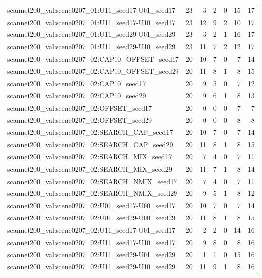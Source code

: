 \begin{table}[t]
\begin{tabular}{lrrrrrr}
scannet200\_val:scene0207\_01:U11\_seed17-U01\_seed17 & 23 & 3 & 2 & 0 & 15 & 17 \\
scannet200\_val:scene0207\_01:U11\_seed17-U10\_seed17 & 23 & 12 & 9 & 2 & 10 & 17 \\
scannet200\_val:scene0207\_01:U11\_seed29-U01\_seed29 & 23 & 3 & 2 & 1 & 16 & 17 \\
scannet200\_val:scene0207\_01:U11\_seed29-U10\_seed29 & 23 & 11 & 7 & 2 & 12 & 17 \\
scannet200\_val:scene0207\_02:CAP10\_OFFSET\_seed17 & 20 & 10 & 7 & 0 & 7 & 14 \\
scannet200\_val:scene0207\_02:CAP10\_OFFSET\_seed29 & 20 & 11 & 8 & 1 & 8 & 15 \\
scannet200\_val:scene0207\_02:CAP10\_seed17 & 20 & 9 & 5 & 0 & 7 & 12 \\
scannet200\_val:scene0207\_02:CAP10\_seed29 & 20 & 9 & 6 & 1 & 8 & 13 \\
scannet200\_val:scene0207\_02:OFFSET\_seed17 & 20 & 0 & 0 & 0 & 7 & 7 \\
scannet200\_val:scene0207\_02:OFFSET\_seed29 & 20 & 0 & 0 & 0 & 8 & 8 \\
scannet200\_val:scene0207\_02:SEARCH\_CAP\_seed17 & 20 & 10 & 7 & 0 & 7 & 14 \\
scannet200\_val:scene0207\_02:SEARCH\_CAP\_seed29 & 20 & 11 & 8 & 1 & 8 & 15 \\
scannet200\_val:scene0207\_02:SEARCH\_MIX\_seed17 & 20 & 7 & 4 & 0 & 7 & 11 \\
scannet200\_val:scene0207\_02:SEARCH\_MIX\_seed29 & 20 & 11 & 7 & 1 & 8 & 14 \\
scannet200\_val:scene0207\_02:SEARCH\_NMIX\_seed17 & 20 & 7 & 4 & 0 & 7 & 11 \\
scannet200\_val:scene0207\_02:SEARCH\_NMIX\_seed29 & 20 & 9 & 5 & 1 & 8 & 12 \\
scannet200\_val:scene0207\_02:U01\_seed17-U00\_seed17 & 20 & 10 & 7 & 0 & 7 & 14 \\
scannet200\_val:scene0207\_02:U01\_seed29-U00\_seed29 & 20 & 11 & 8 & 1 & 8 & 15 \\
scannet200\_val:scene0207\_02:U11\_seed17-U01\_seed17 & 20 & 2 & 2 & 0 & 14 & 16 \\
scannet200\_val:scene0207\_02:U11\_seed17-U10\_seed17 & 20 & 9 & 8 & 0 & 8 & 16 \\
scannet200\_val:scene0207\_02:U11\_seed29-U01\_seed29 & 20 & 1 & 1 & 0 & 15 & 16 \\
scannet200\_val:scene0207\_02:U11\_seed29-U10\_seed29 & 20 & 11 & 9 & 1 & 8 & 16 \\

\end{tabular}
\end{table}

